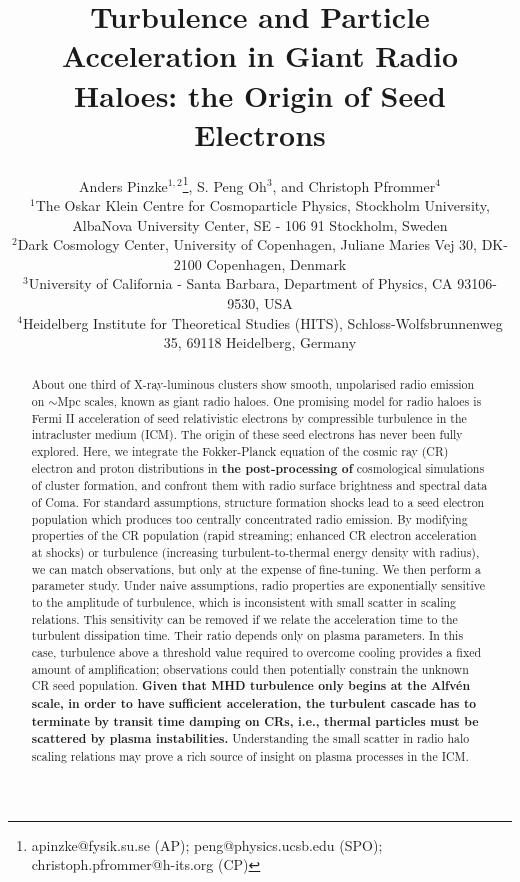 \documentclass[fleqn,usenatbib,useAMS]{mnras}
\title[Origin of Seed Electrons]{Turbulence and Particle Acceleration in Giant Radio Haloes: the Origin of Seed Electrons}
\author[A. Pinzke, S. Peng Oh and C. Pfrommer] 
{Anders Pinzke$^{1,2}$\thanks{apinzke@fysik.su.se (AP); peng@physics.ucsb.edu (SPO); christoph.pfrommer@h-its.org (CP)}, S. Peng Oh$^{3}$\footnotemark[1], and Christoph Pfrommer$^{4}$\footnotemark[1]\\
$^{1}$The Oskar Klein Centre for Cosmoparticle Physics, Stockholm University, AlbaNova University Center, SE - 106 91
  Stockholm, Sweden\\
$^{2}$Dark Cosmology Center, University of Copenhagen,
  Juliane Maries Vej 30, DK-2100 Copenhagen, Denmark\\
  $^{3}$University of California - Santa Barbara,
  Department of Physics, CA 93106-9530, USA\\
$^{4}$Heidelberg Institute for Theoretical Studies
  (HITS), Schloss-Wolfsbrunnenweg 35, 69118 Heidelberg, Germany}
\newcommand\C[1]{{\bf #1}}
\begin{document}
\pagerange{\pageref{firstpage}--\pageref{lastpage}} 
\maketitle
\label{firstpage}



 
\begin{abstract}
  About one third of X-ray-luminous clusters show smooth, unpolarised radio
  emission on $\sim$Mpc scales, known as giant radio haloes. One promising model
  for radio haloes is Fermi II acceleration of seed relativistic electrons by
  compressible turbulence in the intracluster medium (ICM). The origin of these
  seed electrons has never been fully explored. Here, we integrate the
  Fokker-Planck equation of the cosmic ray (CR) electron and proton
  distributions in \C{the post-processing of} cosmological simulations of
  cluster formation, and confront them with radio surface brightness and
  spectral data of Coma. For standard assumptions, structure formation
  shocks lead to a seed electron population which produces too centrally
  concentrated radio emission. By modifying properties of the CR population
  (rapid streaming; enhanced CR electron acceleration at shocks) or turbulence
  (increasing turbulent-to-thermal energy density with radius), we can match
  observations, but only at the expense of fine-tuning. We then perform a
  parameter study. Under naive assumptions, radio properties are exponentially
  sensitive to the amplitude of turbulence, which is inconsistent with small
  scatter in scaling relations. This sensitivity can be removed if we relate the
  acceleration time to the turbulent dissipation time. Their ratio depends only
  on plasma parameters. In this case, turbulence above a threshold value
  required to overcome cooling provides a fixed amount of amplification;
  observations could then potentially constrain the unknown CR seed
  population. \C{Given that MHD turbulence only begins at the Alfv{\'e}n scale, in
    order to have sufficient acceleration, the turbulent cascade has to
    terminate by transit time damping on CRs, i.e., thermal particles must be
    scattered by plasma instabilities.} Understanding the small scatter in radio
  halo scaling relations may prove a rich source of insight on plasma processes
  in the ICM.
\end{abstract} 
\end{document}

